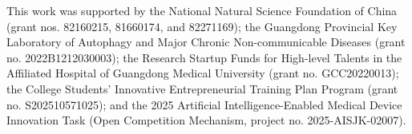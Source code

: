 This work was supported by the National Natural Science Foundation of China (grant nos. 82160215, 81660174, and 82271169); the Guangdong Provincial Key Laboratory of Autophagy and Major Chronic Non-communicable Diseases (grant no. 2022B1212030003); the Research Startup Funds for High-level Talents in the Affiliated Hospital of Guangdong Medical University (grant no. GCC20220013); the College Students' Innovative Entrepreneurial Training Plan Program (grant no. S202510571025); and the 2025 Artificial Intelligence-Enabled Medical Device Innovation Task (Open Competition Mechanism, project no. 2025-AISJK-02007).
